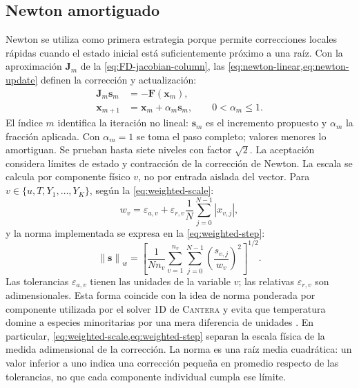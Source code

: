 \documentclass[12pt,a4paper,twoside,openany]{book}
\newcommand{\vect}[1]{\bm{#1}}
\newcommand{\mat}[1]{\bm{#1}}
\newcommand{\norm}[1]{\left\lVert #1\right\rVert}
\newcommand{\abs}[1]{\left\lvert #1\right\rvert}
\newcommand{\Cantera}{\textsc{Cantera}\xspace}
\begin{document}
\subsection{Newton amortiguado}

Newton se utiliza como primera estrategia porque permite correcciones locales
rápidas cuando el estado inicial está suficientemente próximo a una raíz. Con
la aproximación \(\mat J_m\) de la \cref{eq:FD-jacobian-column}, las
\cref{eq:newton-linear,eq:newton-update} definen la corrección y actualización:
\begin{align}
  \mat{J}_m\vect{s}_m&=-\vect{F}(\vect{x}_m),
  \label{eq:newton-linear}\\
  \vect{x}_{m+1}&=\vect{x}_m+\alpha_m\vect{s}_m,
  \qquad 0<\alpha_m\le1.
  \label{eq:newton-update}
\end{align}
El índice \(m\) identifica la iteración no lineal:
\(\vect s_m\) es el incremento propuesto y \(\alpha_m\) la fracción aplicada.
Con \(\alpha_m=1\) se toma el paso completo; valores menores lo amortiguan.
Se prueban hasta siete niveles con factor \(\sqrt{2}\).
La aceptación considera límites de estado y contracción de la corrección de Newton.
La escala se calcula por componente físico \(v\), no por entrada aislada del
vector. Para \(v\in\{u,T,Y_1,\ldots,Y_K\}\), según la \cref{eq:weighted-scale}:
\begin{equation}
  w_v=\varepsilon_{a,v}+\varepsilon_{r,v}
  \frac{1}{N}\sum_{j=0}^{N-1}\abs{x_{v,j}},
  \label{eq:weighted-scale}
\end{equation}
y la norma implementada se expresa en la \cref{eq:weighted-step}:
\begin{equation}
  \norm{\vect{s}}_w=
  \left[\frac{1}{Nn_v}
  \sum_{v=1}^{n_v}\sum_{j=0}^{N-1}
  \left(\frac{s_{v,j}}{w_v}\right)^2\right]^{1/2}.
  \label{eq:weighted-step}
\end{equation}
Las tolerancias \(\varepsilon_{a,v}\) tienen las unidades de la variable
\(v\); las relativas \(\varepsilon_{r,v}\) son adimensionales.
Esta forma coincide con la idea de norma ponderada por componente utilizada por
el solver 1D de \Cantera y evita que temperatura domine a especies minoritarias
por una mera diferencia de unidades \cite{CanteraDocs32}. En particular,
\cref{eq:weighted-scale,eq:weighted-step} separan la escala física de la medida
adimensional de la corrección. La norma es una raíz media cuadrática:
un valor inferior a uno indica una corrección pequeña en promedio respecto
de las tolerancias, no que cada componente individual cumpla ese límite.
\end{document}
